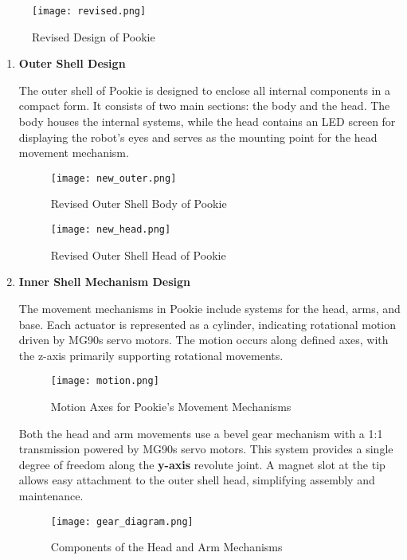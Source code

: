 \begin{figure}[ht]
    \centering
    \texttt{[image: revised.png]}
    \caption{Revised Design of Pookie}
    \label{fig:revised}
\end{figure}

\begin{enumerate}
    \item\textbf{Outer Shell Design}

    The outer shell of Pookie is designed to enclose all internal components in a compact form. It consists of two main sections: the body and the head. The body houses the internal systems, while the head contains an LED screen for displaying the robot's eyes and serves as the mounting point for the head movement mechanism.

\begin{figure}[!ht]
    \centering
    \texttt{[image: new\_outer.png]}
    \caption{Revised Outer Shell Body of Pookie}
    \label{fig:revised_outer}
\end{figure}

\begin{figure}[!ht]
    \centering
    \texttt{[image: new\_head.png]}
    \caption{Revised Outer Shell Head of Pookie}
    \label{fig:revised_head}
\end{figure}

\newpage
\item\textbf{Inner Shell Mechanism Design}

The movement mechanisms in Pookie include systems for the head, arms, and base. Each actuator is represented as a cylinder, indicating rotational motion driven by MG90s servo motors. The motion occurs along defined axes, with the z-axis primarily supporting rotational movements. 

\begin{figure}[!htb]
    \centering
    \texttt{[image: motion.png]}
    \caption{Motion Axes for Pookie's Movement Mechanisms}
    \label{fig:motion}
\end{figure}

Both the head and arm movements use a bevel gear mechanism with a 1:1 transmission powered by MG90s servo motors. This system provides a single degree of freedom along the \textbf{y-axis} revolute joint. A magnet slot at the tip allows easy attachment to the outer shell head, simplifying assembly and maintenance.

\newpage
\begin{figure} [!htb]
    \centering
    \texttt{[image: gear\_diagram.png]}
    \caption{Components of the Head and Arm Mechanisms}
    \label{fig:components_head_arm}
\end{figure}


\end{enumerate}
